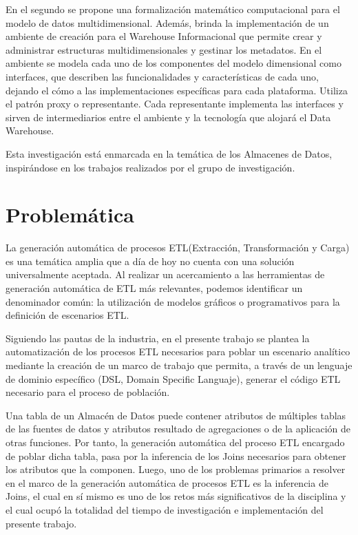 En el segundo se propone una formalización matemático computacional para el modelo de datos multidimensional. Además,
brinda la implementación de un ambiente de creación para el Warehouse Informacional que permite crear y administrar 
estructuras multidimensionales y gestinar los metadatos. En el ambiente se modela cada uno de los componentes del modelo 
dimensional como interfaces, que describen las funcionalidades y caracter\'isticas de cada uno, dejando el c\'omo a las 
implementaciones 
espec\'ificas para cada plataforma. Utiliza el patr\'on proxy o representante. Cada representante implementa 
las interfaces y sirven de intermediarios entre el ambiente y la tecnología que alojar\'a el Data Warehouse.

Esta investigaci\'on est\'a enmarcada en la tem\'atica de los Almacenes de Datos, inspir\'andose en los trabajos 
realizados por el grupo de investigación.


\section{Problem\'atica}

La generaci\'on autom\'atica de procesos ETL(Extracción, Transformación y Carga) es una tem\'atica amplia que a d\'ia de hoy no cuenta con una soluci\'on 
universalmente aceptada. Al realizar un acercamiento a las herramientas de generación automática de ETL más relevantes, podemos 
identificar un denominador común: la utilización de modelos gr\'aficos o programativos para la definición de 
escenarios ETL.

Siguiendo las pautas de la industria, en el presente trabajo se plantea la automatización de los procesos ETL necesarios 
para poblar un escenario analítico mediante la creaci\'on de un marco de trabajo que permita, a trav\'es de un lenguaje de dominio espec\'ifico
(DSL, Domain Specific Languaje), generar el c\'odigo ETL necesario para el proceso de población.

Una tabla de un Almacén de Datos puede contener atributos de m\'ultiples tablas de las fuentes de datos y 
atributos resultado de agregaciones o de la aplicaci\'on de otras funciones. Por tanto, la generaci\'on autom\'atica 
del proceso ETL encargado de poblar dicha tabla, pasa por la inferencia de los Joins necesarios para obtener los atributos 
que la componen. Luego, uno de los problemas primarios a resolver en 
el marco de la generaci\'on autom\'atica de procesos ETL es la inferencia de Joins, el cual en s\'i mismo es uno de 
los retos m\'as significativos de la disciplina y el cual ocup\'o la totalidad del tiempo de investigación e implementación del presente 
trabajo.

